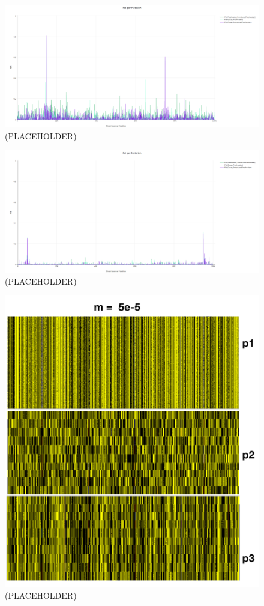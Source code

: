 \documentclass{article}
\begin{document}
\begin{figure}[h!tb]
	\begin{center}
  		\includegraphics[width=0.7\linewidth]{plotlyPlots/FstAcross5e-3.png}
  		\caption{(PLACEHOLDER)
		}
  		\label{fig:Fst3}
	\end{center}
\end{figure}

\begin{figure}[h!tb]
	\begin{center}
  		\includegraphics[width=0.7\linewidth]{plotlyPlots/FstAcross5e-2.png}
  		\caption{(PLACEHOLDER)
		}
  		\label{fig:Fst4}
	\end{center}
\end{figure}

\begin{figure}[h!tb]
	\begin{center}
  		\includegraphics[width=0.7\linewidth]{plotlyPlots/Haplo5e-5.png}
  		\caption{ (PLACEHOLDER)
		}
  		\label{fig:Haplo1}
	\end{center}
\end{figure}
\end{document}
